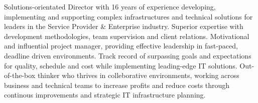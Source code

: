 

\begin{cvparagraph}

	Solutions-orientated Director with 16 years of experience developing, implementing and supporting complex infrastructures and technical
	solutions for leaders in the Service Provider \& Enterprise industry. Superior expertise with development methodologies, team 
	supervision and client relations. Motivational and influential project manager, providing effective leadership in fast-paced, 
	deadline driven environments. Track record of surpassing goals and expectations for quality, schedule and cost while implementing 
	leading-edge IT solutions. Out-of-the-box thinker who thrives in colleborative environments, working across business and technical 
	teams to increase profits and reduce costs through continous improvements and strategic IT infrastructure planning.
\end{cvparagraph}
